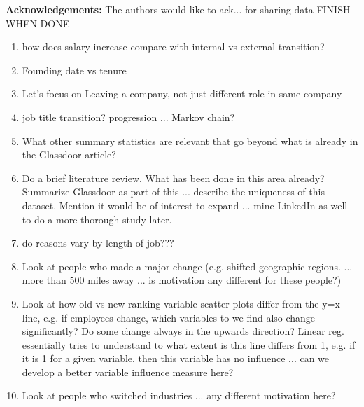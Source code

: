 \documentclass[10pt]{article}
\begin{document}
\textbf{Acknowledgements:} The authors would like to ack... for sharing data FINISH WHEN DONE





\begin{enumerate}
    \item how does salary increase compare with internal vs external transition? 
    \item Founding date vs tenure
    \item Let's focus on Leaving a company, not just different role in same company 
    \item job title transition? progression ... Markov chain? 
    \item What other summary statistics are relevant that go beyond what is already in 
          the Glassdoor article? 
    \item Do a brief literature review.  What has been done in this area already?
          Summarize Glassdoor as part of this ... describe the uniqueness of this dataset. 
          Mention it would be of interest to expand ... mine LinkedIn as well to do a 
          more thorough study later. 
    \item do reasons vary by length of job??? 
    \item Look at people who made a major change (e.g. shifted geographic regions. ... more than 500 miles 
          away ... is motivation any different for these people?)
    \item Look at how old vs new ranking variable scatter plots differ from the y=x line, 
        e.g. if employees change, which variables to we find also change significantly?  
          Do some change always in the upwards direction? Linear reg. essentially tries 
          to understand to what extent is this line differs from 1, e.g. if it is 1 for 
          a given variable, then this variable has no influence ... can we develop a 
          better variable influence measure here? 
    \item Look at people who switched industries ... any different motivation here? 

\end{enumerate}
\end{document}
